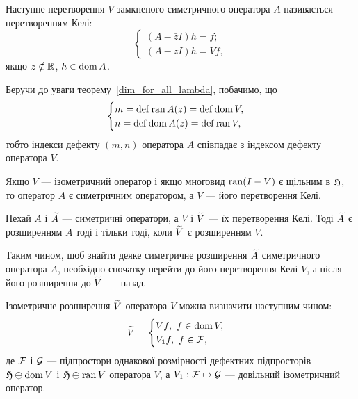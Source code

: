\begin{definition}
	Наступне перетворення $V$ замкненого симетричного оператора $A$ називається перетворенням Келі:
	\begin{equation} \label{Cayley_f_cases}
		\begin{cases}
			(A - \bar zI)h = f;\\
			(A - zI)h = Vf,
	 	\end{cases}
	\end{equation}
 	якщо $z\notin \mathbb{R}$, $h\in \operatorname{dom}{A}$.
\end{definition}

Беручи до уваги теорему~\ref{dim_for_all_lambda}, побачимо, що
\begin{equation}
	\begin{cases}
		m = \operatorname{def} \operatorname{ran}{A(\bar z)} = \operatorname{def} \operatorname{dom}{V}, \\
		n = \operatorname{def} \operatorname{dom}{A(z)} = \operatorname{def} \operatorname{ran}{V}, 
	\end{cases}
\end{equation}
тобто індекси дефекту $(m,n)$ оператора $A$ співпадає з індексом дефекту оператора $V$.

\begin{theorem}
	Якщо $V$ --- ізометричний оператор і якщо многовид $\operatorname{ran} (I-V)$ є щільним в $\mathfrak{H}$, то оператор $A$ є симетричним оператором, а $V$ --- його перетворення Келі.
\end{theorem}

\begin{theorem}
	Нехай $A$ і $\widetilde A$ --- симетричні оператори, а $V$ і $\widetilde V$ --- їх перетворення Келі. Тоді $\widetilde A$ є розширенням $A$ тоді і тільки тоді, коли $\widetilde V$ є розширенням $V$.
\end{theorem}

Таким чином, щоб знайти деяке симетричне розширення $\widetilde A$ симетричного оператора $A$, необхідно спочатку перейти до його перетворення Келі $V$, а після його розширення до $\widetilde V$~--- назад.

Ізометричне розширення $\widetilde V$ оператора $V$ можна визначити наступним чином:
\begin{equation} \label{extention_V}
	\widetilde V = 
	\begin{cases}
		Vf, \ f\in \operatorname{dom}{V},\\
		V_1f,\ f\in \mathcal{F},
	\end{cases}
\end{equation}
де $\mathcal{F}$ і $\mathcal{G}$ --- підпростори однакової розмірності дефектних підпросторів $\mathfrak{H}\ominus\operatorname{dom}{V}$ і $\mathfrak{H}\ominus\operatorname{ran}{V}$ оператора $V$, а $V_1:\mathcal{F}\mapsto\mathcal{G}$ --- довільний ізометричний оператор.

